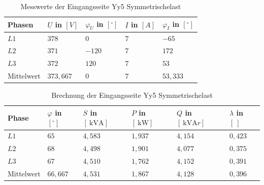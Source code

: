 \begin{enumerate}[label=\alph*)]
	      \begin{table}[h!]
		      \caption{Messwerte der Eingangsseite Yy5 Symmetrischelast}
		      \centering
		      \begin{tabular}{lllll}
			      \\ \hline
			      Phasen     & $\underline{U}$ in $[V]$ & $\varphi_{U}$ in $[^\circ]$ & $\underline{I}$ in $[A]$ & $\varphi_{I}$ in $[^\circ]$ \\ \hline
			      $L1$       & $378$                    & $0$                         & $7$                      & $-65$                       \\
			      $L2$       & $371$                    & $-120$                      & $7$                      & $172$                       \\
			      $L3$       & $372$                    & $120$                       & $7$                      & $53$                        \\ \hline
			      Mittelwert & $373,667$                & $0$                         & $7$                      & $53,333$                    \\ \hline\hline
		      \end{tabular}
	      \end{table}

	      \begin{table}[h!]
		      \caption{Brechnung der Eingangsseite Yy5 Symmetrischelast}
		      \centering
		      \begin{tabular}{llllll}
			      \\ \hline
			      Phase      & $\varphi$ in $[^\circ]$ & $S$ in $[\SI{}{\kilo\volt\ampere}]$ & $P$ in $[\SI{}{\kilo\watt}]$ & $Q$ in $[\SI{}{\kilo\volt\ampere r}]$ & $\lambda$ in $[\ ]$ \\ \hline
			      $L1$       & $65$                    & $4,583$                             & $1,937$                      & $4,154$                               & $0,423$             \\
			      $L2$       & $68$                    & $4,498$                             & $1,901$                      & $4,077$                               & $0,375$             \\
			      $L3$       & $67$                    & $4,510$                             & $1,762$                      & $4,152$                               & $0,391$             \\ \hline
			      Mittelwert & $66,667$                & $4,531$                             & $1,867$                      & $4,128$                               & $0,396$             \\ \hline\hline
		      \end{tabular}
	      \end{table}


\end{enumerate}
